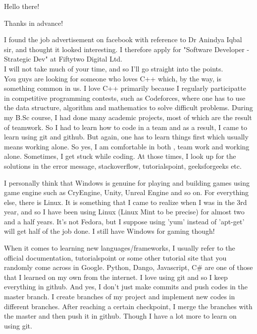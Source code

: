 \documentclass[11pt,a4paper,roman]{moderncv}
\begin{document}
\date{\today}
\opening{Hello there!}
\closing{Thanks in advance!}
\makelettertitle



I found the job advertisement on facebook with reference to Dr Anindya Iqbal sir, and 
thought it looked interesting. I therefore apply for "Software Developer - Strategic Dev" at Fiftytwo Digital Ltd. \\

I will not take much of your time, and so I'll go straight into the points. \\
You guys are looking for someone who loves C++ 
which, by the way, is something common in us. I love C++ primarily because I regularly participatte in competitive 
programming contests, such as Codeforces, where one has to use the data structure, 
algorithm and mathematics to solve difficult problems. During my B.Sc course, 
I had done many academic projects, most of which are 
the result of teamwork. So I had to learn how to code in a team and as a result, I came to learn using git and github. 
But again, one has to learn things first which usually means working alone. So yes,
I am comfortable in both , team work and working alone. Sometimes, I get stuck while coding. At those times, I 
look up for the solutions in the error message, stackoverflow, tutorialspoint, geeksforgeeks etc.

I personally think that Windows is genuine for playing and building games using game engine such as CryEngine, Unity, Unreal Engine and so on.
For everything else, there is Linux. It is something that I came to realize when I was in the 3rd year, and 
so I have been using Linux 
(Linux Mint to be precise) for almost two and a half years. It's not Fedora, but I suppose using 'yum' instead of 'apt-get' 
will get half of the job done. I still have Windows for gaming though!

When it comes to learning new languages/frameworks, I usually refer to the official documentation, tutorialspoint or 
some other tutorial site that you randomly come across in Google. Python, Dango, Javascript, C\# are one of those that I learned
on my own from the internet.
 I love using git and so I keep everything in github. And yes, I don't just make commits and push codes in the master branch.
  I create branches of my project and implement new codes in different branches. After reaching a certain checkpoint, I merge the branches with the master and then 
  push it in github. Though I have a lot more to learn on using git.
 
\end{document}
